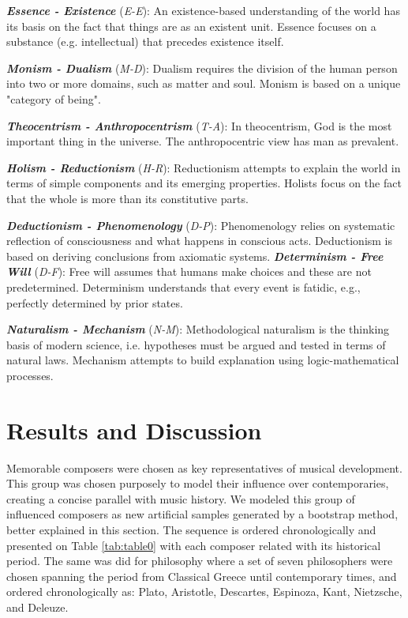 \documentclass[
 aip,
 jmp,
 amsmath,amssymb,
 reprint,
]{revtex4-1}
\begin{document}
{\bf \em{ Essence - Existence}} (\emph{E-E}): An existence-based
understanding of the world has its basis on the fact that things are
as an existent unit. Essence focuses on a substance
(e.g. intellectual) that precedes existence itself.

{\bf \em{ Monism - Dualism}} (\emph{M-D}): Dualism requires the
division of the human person into two or more domains, such as matter
and soul. Monism is based on a unique "category of being".

{\bf \em{ Theocentrism - Anthropocentrism}} (\emph{T-A}): In
theocentrism, God is the most important thing in the universe.  The
anthropocentric view has man as prevalent.

{\bf \em{ Holism - Reductionism}} (\emph{H-R}): Reductionism attempts
to explain the world in terms of simple components and its emerging
properties.  Holists focus on the fact that the whole is more than its
constitutive parts.

{\bf \em{ Deductionism - Phenomenology}} (\emph{D-P}): Phenomenology
relies on systematic reflection of consciousness and what happens in
conscious acts.  Deductionism is based on deriving conclusions from
axiomatic systems.  {\bf \em{ Determinism - Free Will}} (\emph{D-F}):
Free will assumes that humans make choices and these are not
predetermined.  Determinism understands that every event is fatidic,
e.g., perfectly determined by prior states.

{\bf \em{ Naturalism - Mechanism}} (\emph{N-M}): Methodological
naturalism is the thinking basis of modern science, i.e. hypotheses
must be argued and tested in terms of natural laws. Mechanism attempts
to build explanation using logic-mathematical processes.

\section{Results and Discussion}
\label{sec:results}

Memorable composers were chosen as key representatives
of musical development. 
This group was chosen purposely to model their influence
over contemporaries, creating a concise parallel with music history. We modeled this group of influenced
composers as new artificial samples generated by a bootstrap method, better
explained in this section.
The sequence
is ordered chronologically and presented on Table \ref{tab:table0} with
each composer related with its historical period.
The same was did for philosophy where a set of seven philosophers were chosen spanning the period from Classical Greece until contemporary times, and ordered chronologically as: Plato, Aristotle, Descartes, Espinoza, Kant, Nietzsche, and Deleuze.  
\end{document}
